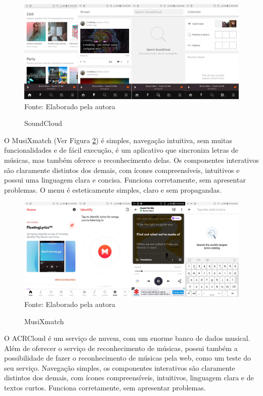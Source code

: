 \begin{figure}[!htb]
   \centering
   \caption{SoundCloud}\label{fig:soundcloud} 
   \includegraphics[scale=0.12]{figuras/soundcloud.jpg}
   \\Fonte: Elaborado pela autora
\end{figure}

O MusiXmatch (Ver Figura \ref{fig:musixmatch}) é simples, navegação intuitiva, sem muitas funcionalidades e de fácil execução, é um aplicativo que sincroniza letras de músicas, mas também oferece o reconhecimento delas. Os componentes interativos são claramente distintos dos demais, com ícones compreensíveis, intuitivos e possui uma linguagem clara e concisa. Funciona corretamente, sem apresentar problemas. O menu é esteticamente simples, claro e sem propagandas.

\begin{figure}[!htb]
   \centering
   \caption{MusiXmatch}\label{fig:musixmatch} 
   \includegraphics[scale=0.12]{figuras/musixmatch.jpg}
   \\Fonte: Elaborado pela autora
\end{figure}

O ACRCloud é um serviço de nuvem, com um enorme banco de dados musical. Além de oferecer o serviço de reconhecimento de músicas, possui também a possibilidade de fazer o reconhecimento de músicas pela web, como um teste do seu serviço. Navegação simples, os componentes interativos são claramente distintos dos demais, com ícones compreensíveis, intuitivos, linguagem clara e de textos curtos. Funciona corretamente, sem apresentar problemas.


